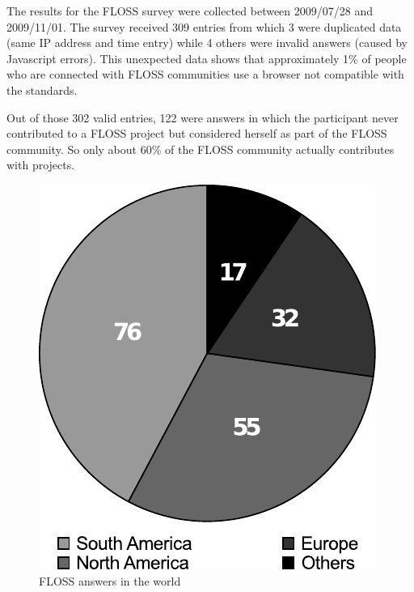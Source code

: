 \documentclass[lnbip]{svmultln}
\begin{document}
The results for the FLOSS survey were collected between 2009/07/28 and
2009/11/01. The survey received 309 entries from which 3 were
duplicated data (same IP address and time entry) while 4 others were
invalid answers (caused by Javascript errors). This unexpected data
shows that approximately 1\% of people who are connected with FLOSS
communities use a browser not compatible with the standards.

Out of those 302 valid entries, 122 were answers in which the
participant never contributed to a FLOSS project but considered
herself as part of the FLOSS community. So only about 60\% of the
FLOSS community actually contributes with projects.

\begin{figure}[htb]
  \begin{minipage}[t]{0.5\linewidth}
    \includegraphics[scale=0.8]{floss-world.pdf}
    \caption{FLOSS answers in the world}
    \label{fig:floss-world}
  \end{minipage}
  \begin{minipage}[t]{0.5\linewidth}

\end{minipage}
\end{figure}
\end{document}
